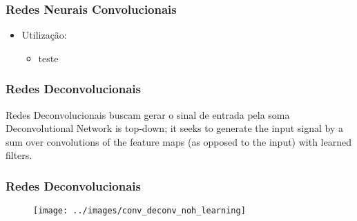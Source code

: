 \documentclass[11pt]{beamer}
\begin{document}
	\frame[plain]{\maketitle}
	
	\begin{frame}
		\frametitle{Redes Neurais Convolucionais}
		\begin{itemize}
			\item Utilização:
				\begin{itemize}
					\item teste
				\end{itemize}
		\end{itemize}
			
	\end{frame}


	\begin{frame}
		\frametitle{Redes Deconvolucionais}
		Redes Deconvolucionais buscam gerar o sinal de entrada pela soma 
Deconvolutional Network
is top-down; it seeks to generate the input signal by a sum
over convolutions of the feature maps (as opposed to the
input) with learned filters.		
	\end{frame}
	\begin{frame}
	\frametitle{Redes Deconvolucionais}
	\begin{figure}
		\centering
		\texttt{[image: ../images/conv\_deconv\_noh\_learning]}
		\caption{}
		\label{fig:convdeconvnohlearning}
	\end{figure}
		
\end{frame}
\end{document}
